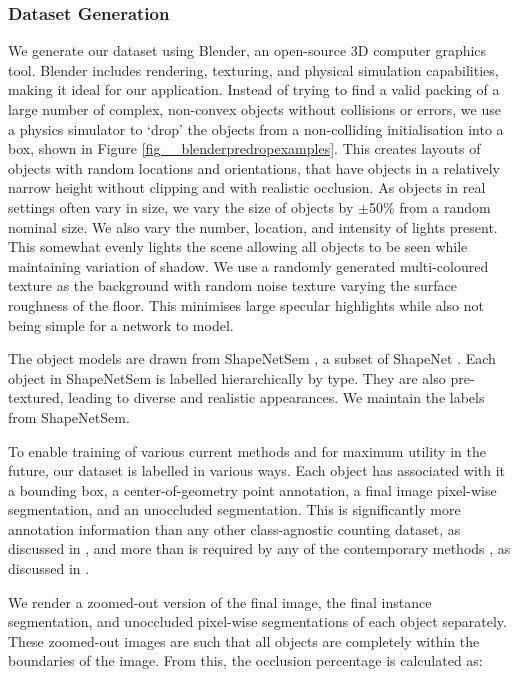 \documentclass[../thesis.tex]{subfiles}
\begin{document}
\subsubsection{Dataset Generation}
We generate our dataset using Blender, an open-source 3D computer graphics tool. Blender includes rendering, texturing, and physical simulation capabilities, making it ideal for our application. 
Instead of trying to find a valid packing of a large number of complex, non-convex objects without collisions or errors, we use a physics simulator to `drop' the objects from a non-colliding initialisation into a box, shown in Figure \ref{fig__blenderpredropexamples}. This creates layouts of objects with random locations and orientations, that have objects in a relatively narrow height without clipping and with realistic occlusion. 
As objects in real settings often vary in size, we vary the size of objects by $\pm$50\% from a random nominal size.
We also vary the number, location, and intensity of lights present. This somewhat evenly lights the scene allowing all objects to be seen while maintaining variation of shadow. 
We use a randomly generated multi-coloured texture as the background with random noise texture varying the surface roughness of the floor. This minimises large specular highlights while also not being simple for a network to model.


The object models are drawn from ShapeNetSem \cite{savva2015semantically}, a subset of ShapeNet \cite{shapenet2015}. Each object in ShapeNetSem is labelled hierarchically by type.
They are also pre-textured, leading to diverse and realistic appearances.
We maintain the labels from ShapeNetSem.


To enable training of various current methods \cite{ranjan2021Famnet, ranjan2022exemplar, liu2022countr} and for maximum utility in the future, 
our dataset is labelled in various ways.
Each object has associated with it a bounding box, a center-of-geometry point annotation, a final image pixel-wise segmentation, and an unoccluded segmentation. 
This is significantly more annotation information than any other class-agnostic counting dataset, as discussed in , and more than is required by any of the contemporary methods \cite{liu2022countr, ranjan2022exemplar, shi2022represent}, as discussed in .

We render a zoomed-out version of the final image, the final instance segmentation, and unoccluded pixel-wise segmentations of each object separately.
These zoomed-out images are such that all objects are completely within the boundaries of the image. 
From this, the occlusion percentage is calculated as:
\end{document}
